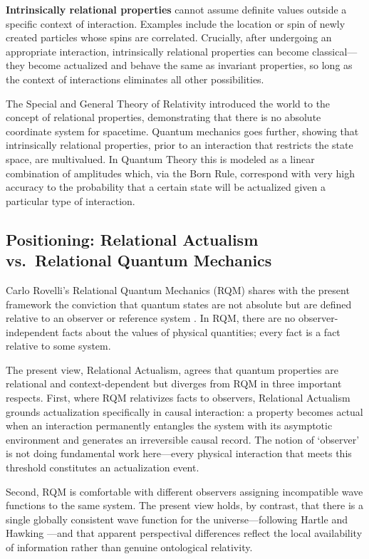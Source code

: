 \documentclass[11pt,a4paper]{article}
\theoremstyle{plain}
\theoremstyle{definition}
\theoremstyle{remark}
\begin{document}
\textbf{Intrinsically relational properties} cannot assume definite values outside
a specific context of interaction. Examples include the location or spin of newly
created particles whose spins are correlated. Crucially, after undergoing an
appropriate interaction, intrinsically relational properties can become
classical---they become actualized and behave the same as invariant properties, so
long as the context of interactions eliminates all other possibilities.

The Special and General Theory of Relativity introduced the world to the concept
of relational properties, demonstrating that there is no absolute coordinate
system for spacetime. Quantum mechanics goes further, showing that intrinsically
relational properties, prior to an interaction that restricts the state space, are
multivalued. In Quantum Theory this is modeled as a linear combination of
amplitudes which, via the Born Rule, correspond with very high accuracy to the
probability that a certain state will be actualized given a particular type of
interaction.

\subsection{Positioning: Relational Actualism vs.\ Relational Quantum Mechanics}

Carlo Rovelli's Relational Quantum Mechanics (RQM) shares with the present
framework the conviction that quantum states are not absolute but are defined
relative to an observer or reference system \citep{Rovelli1996}. In RQM, there
are no observer-independent facts about the values of physical quantities; every
fact is a fact relative to some system.

The present view, Relational Actualism, agrees that quantum properties are
relational and context-dependent but diverges from RQM in three important
respects. First, where RQM relativizes facts to observers, Relational Actualism
grounds actualization specifically in causal interaction: a property becomes actual
when an interaction permanently entangles the system with its asymptotic
environment and generates an irreversible causal record. The notion of `observer'
is not doing fundamental work here---every physical interaction that meets this
threshold constitutes an actualization event.

Second, RQM is comfortable with different observers assigning incompatible wave
functions to the same system. The present view holds, by contrast, that there is a
single globally consistent wave function for the universe---following Hartle and
Hawking \citep{HartleHawking1983}---and that apparent perspectival differences
reflect the local availability of information rather than genuine ontological
relativity.
\end{document}
